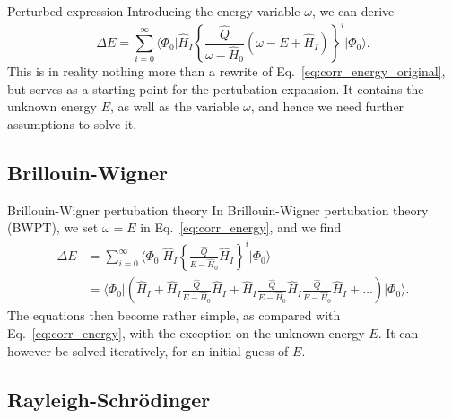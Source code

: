 \documentclass[UKenglish,aspectratio=169]{beamer}
\begin{document}
\begin{frame}{Perturbed expression}
    Introducing the energy variable $\omega$, we can derive
    \begin{equation}\label{eq:corr_energy}
        \Delta E = \sum_{i = 0}^\infty \Big\langle \Phi_0 \big\vert \hat{H}_I \left\{
            \frac{\hat{Q}}{\omega - \hat{H}_0} \left( \omega - E + \hat{H}_I \right)
        \right\}^{i} \big\lvert \Phi_0 \Big\rangle.
    \end{equation}
    This is in reality nothing more than a rewrite of Eq.~\eqref{eq:corr_energy_original}, but serves as a starting point for the pertubation expansion.
    It contains the unknown energy $E$, as well as the variable $\omega$, and hence we need further assumptions to solve it.
\end{frame}

\subsection{Brillouin-Wigner}

\begin{frame}{Brillouin-Wigner pertubation theory}
    In Brillouin-Wigner pertubation theory (BWPT), we set $\omega = E$ in Eq.~\eqref{eq:corr_energy}, and we find
    \begin{equation}
        \begin{split}
            \Delta E &= \sum_{i = 0}^\infty \Big\langle \Phi_0 \big\vert \hat{H}_I \left\{
                \frac{\hat{Q}}{E - \hat{H}_0} \hat{H}_I
            \right\}^{i} \big\lvert \Phi_0 \Big\rangle \\
            &= \Big\langle \Phi_0 \vert \left( \hat{H}_I + \hat{H}_I \frac{\hat{Q}}{E - \hat{H}_0} \hat{H}_I + \hat{H}_I \frac{\hat{Q}}{E - \hat{H}_0} \hat{H}_I \frac{\hat{Q}}{E - \hat{H}_0} \hat{H}_I + \ldots \right) \big\lvert \Phi_0 \Big\rangle.
        \end{split}
    \end{equation}
    The equations then become rather simple, as compared with Eq.~\eqref{eq:corr_energy}, with the exception on the unknown energy $E$.
    It can however be solved iteratively, for an initial guess of $E$.
\end{frame}

\subsection{Rayleigh-Schrödinger}
\end{document}
